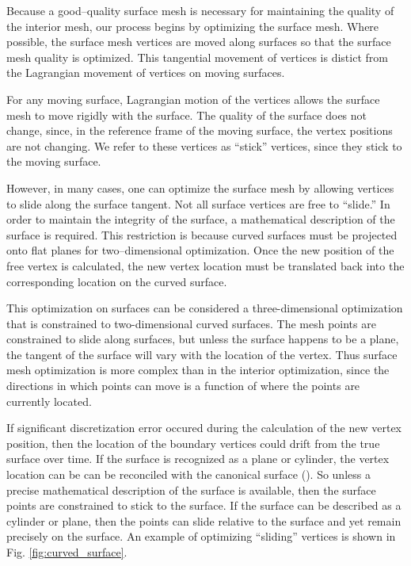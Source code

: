 \documentclass[a4paper,12pt,notitlepage]{article}
\begin{document}
Because a good--quality surface mesh is necessary for maintaining the
quality of the interior mesh, our process begins by optimizing the
surface mesh.  Where possible, the surface mesh vertices are moved
along surfaces so that the surface mesh quality is optimized.  This
tangential movement of vertices is distict from the Lagrangian
movement of vertices on moving surfaces.

For any moving surface, Lagrangian motion of the vertices allows the
surface mesh to move rigidly with the surface. The quality of the
surface does not change, since, in the reference frame of the moving
surface, the vertex positions are not changing.  We refer to these
vertices as ``stick'' vertices, since they stick to the moving surface.

However, in many cases, one can optimize the surface mesh by allowing
vertices to slide along the surface tangent.  Not all surface vertices
are free to ``slide.''  In order to maintain the integrity of
the surface, a mathematical description of the surface is required.
This restriction is because curved surfaces must be projected onto
flat planes for two--dimensional optimization.  Once the new position
of the free vertex is calculated, the new vertex location must be
translated back into the corresponding location on the curved surface.

This optimization on surfaces can be considered a three-dimensional optimization that is constrained to  two-dimensional curved surfaces.
 The mesh points are constrained to
slide along surfaces, but unless the surface happens to be a plane,
the tangent of the surface will vary with the location of the vertex.
Thus surface mesh optimization is more complex than in the interior optimization, since the directions in which points can move is a function of where the points are currently located.

If significant discretization error occured during the calculation of
the new vertex position, then the location of the boundary vertices
could drift from the true surface over time.  If the surface is
recognized as a plane or cylinder, the vertex location can be can be reconciled with the
canonical surface (\cite{mesquite:freitag}).  So unless a precise mathematical
description of the surface is available, then the surface points are
constrained to stick to the surface.  If the surface can be described
as a cylinder or plane, then the points can slide relative to the
surface and yet remain precisely on the surface.  An example of
optimizing ``sliding'' vertices is shown in
Fig. \ref{fig:curved_surface}.
\end{document}
